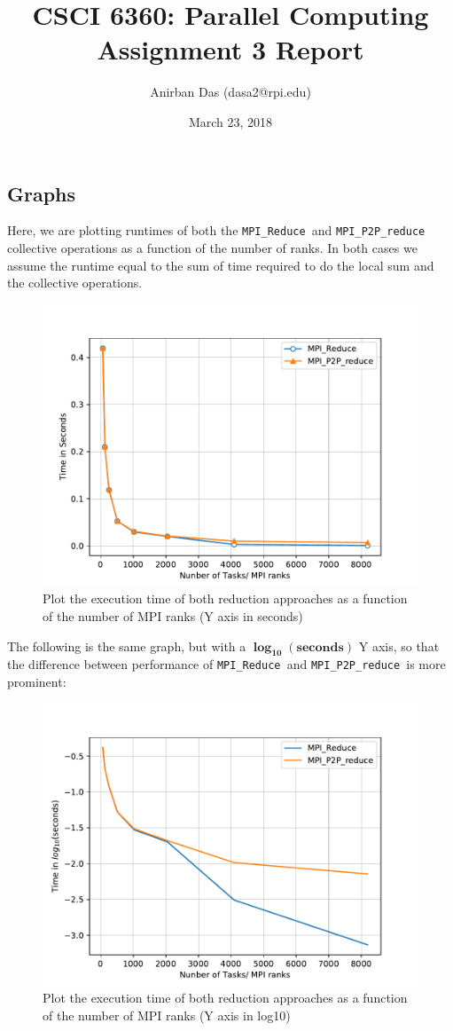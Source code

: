 \documentclass[a4paper,12 pt]{article}
\title{\vspace{-2.0cm}CSCI 6360: Parallel Computing Assignment 3 Report}
\author{Anirban Das (dasa2@rpi.edu) }
\date{March 23, 2018}
\newcommand{\mpi}{\texttt{MPI\_Reduce }}
\newcommand{\pp}{\texttt{MPI\_P2P\_reduce }}
\begin{document}
\maketitle

\subsection{Graphs}
Here, we are plotting runtimes of both the \mpi and \pp collective operations as a function of the number of ranks. In both cases we assume the runtime equal to the sum of time required to do the local sum and the collective operations. 
\begin{figure}[H]
	\centering
	\includegraphics[width=0.8\linewidth]{Graphs/MPI_vs_P2P}
  \caption{Plot the execution time of both reduction approaches as a function of the number of MPI ranks (Y axis in seconds)}
\end{figure}
The following is the same graph, but with a $\pmb{\log_{10}(seconds)}$ Y axis, so that the difference between performance of \mpi and \pp is more prominent:
\begin{figure}[H]
	\centering
	\includegraphics[width=\linewidth]{Graphs/MPI_vs_P2P_log}
  \caption{Plot the execution time of both reduction approaches as a function of the number of MPI ranks (Y axis in log10)}
\end{figure}
\end{document}
